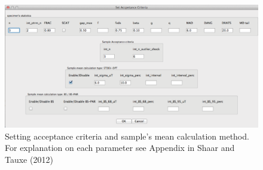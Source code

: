 \documentclass[12pt]{article}
\begin{document}
\begin{figure}[h!]
	\includegraphics[width=1.0\textwidth]{EPSFiles/Screenshot_criteria_dialog.eps}
	 \caption{Setting  acceptance criteria and sample's mean calculation method. For explanation on each parameter see Appendix in Shaar and Tauxe (2012) }
\end{figure}
\end{document}
